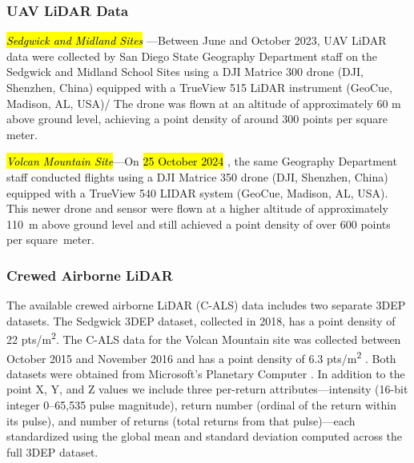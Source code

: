 \documentclass[remotesensing,article,accept,pdftex,moreauthors]{Definitions/mdpi}
\begin{document}
\subsubsection{UAV LiDAR Data}
\textit{\hl{Sedgwick and Midland Sites}%
}---Between June and October 2023, UAV LiDAR data were collected by San Diego State Geography Department staff on the Sedgwick and Midland School Sites using a DJI Matrice 300 drone (DJI, Shenzhen, China) %
 equipped with a TrueView 515 LiDAR instrument (GeoCue, Madison, AL, USA)/%
The drone was flown at an altitude of approximately 60 m above ground level, achieving a point density of around 300 points per square meter.

\textit{\hl{Volcan Mountain Site}}---On \hl{25 October 2024}%
, the same Geography Department staff conducted flights using a DJI Matrice 350 drone (DJI, Shenzhen, China) equipped with a TrueView 540 LIDAR system (GeoCue, Madison, AL, USA). This newer drone and sensor were flown at a higher altitude of approximately \mbox{110 m} above ground level and still achieved a point density of over 600 points per \mbox{square meter}.

\subsubsection{Crewed Airborne LiDAR}
The available crewed airborne LiDAR (C-ALS) data includes two separate 3DEP datasets. The Sedgwick 3DEP dataset, collected in 2018, has a point density of 22 pts/m\textsuperscript{2}. The C-ALS data for the Volcan Mountain site was collected between October 2015 and November 2016 and has a point density of 6.3 pts/m\textsuperscript{2} \citep{usgs_usgs_2016}. Both datasets were obtained from Microsoft's Planetary Computer \citep{us_geological_survey_3d_elevation_program_usgs_2023,planetary_computer}.
In addition to the point X, Y, and Z values we include three per-return attributes—intensity (16-bit integer 0–65,535 pulse magnitude), return number (ordinal of the return within its pulse), and number of returns (total returns from that pulse)—each standardized using the global mean and standard deviation computed across the full 3DEP dataset.
\end{document}

